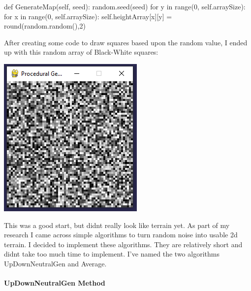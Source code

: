 \begin{flushleft}
            \begin{pythoncode}
def GenerateMap(self, seed):
    random.seed(seed)
    for y in range(0, self.arraySize):
        for x in range(0, self.arraySize):
            self.heightArray[x][y] = round(random.random(),2)
        \end{pythoncode}

            \vspace{0.5cm}

            \large
            After creating some code to draw squares based upon the random value, I ended up with this 
            random array of Black-White squares:\\
            \vspace{0.5cm}
            \centerline{\includegraphics{Images/Prototype/RandomNoiseExample.PNG}}

            \vspace{0.5cm}

            This was a good start, but didnt really look like terrain yet. As part of my research I came 
            across simple algorithms to turn random noise into usable 2d terrain. I decided to implement
            these algorithms. They are relatively short and didnt take too much time to implement. I've
            named the two algorithms UpDownNeutralGen and Average.

            \vspace{1cm}

            \paragraph{UpDownNeutralGen Method} \mbox{} \\
            \vspace{0.25cm}


\end{flushleft}
